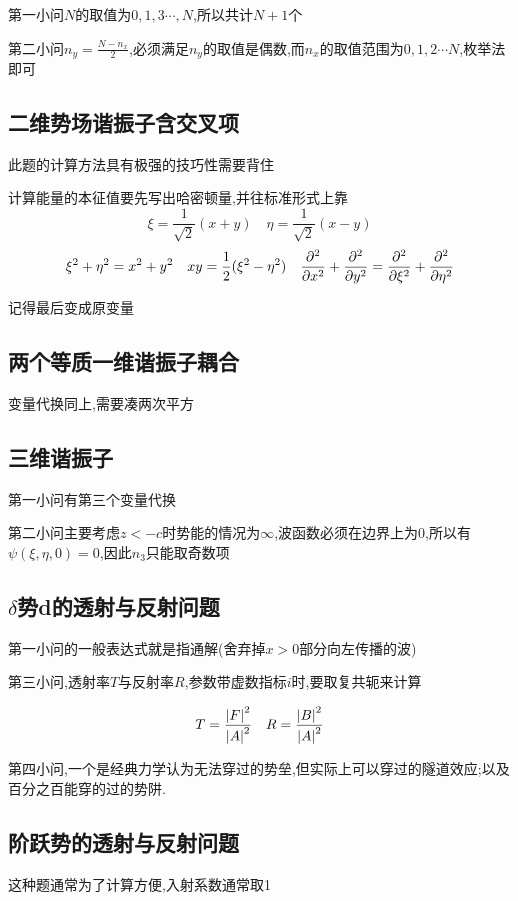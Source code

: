 \documentclass{article}
\begin{document}
            第一小问$N$的取值为$0,1,3\cdots,N$,所以共计$N+1$个
            
            第二小问$ n_{y} = \frac{ N - n_{x}}{2} $,必须满足$n_{y}$的取值是偶数,而$n_{x}$的取值范围为$0,1,2\cdots N$,枚举法即可

        \subsection{二维势场谐振子含交叉项}
            此题的计算方法具有极强的技巧性需要背住
            
            计算能量的本征值要先写出哈密顿量,并往标准形式上靠
            $$ \xi = \frac{1}{\sqrt{2}} (x+y) \quad \eta = \frac{1}{\sqrt{2}} (x -y)  $$
            $$ \xi^{2} + \eta^{2} = x^{2} + y^{2} \quad xy = \frac{1}{2} (\xi^{2} - \eta^{2}) \quad \pdv[2]{x} + \pdv[2]{y} = \pdv[2]{\xi} + \pdv[2]{\eta}$$
            
            记得最后变成原变量

        \subsection{两个等质一维谐振子耦合}
            变量代换同上,需要凑两次平方

        \subsection{三维谐振子}
            第一小问有第三个变量代换

            第二小问主要考虑$z<-c$时势能的情况为$\infty$,波函数必须在边界上为0,所以有$ \psi(\xi,\eta,0) = 0 $,因此$n_{3}$只能取奇数项
        
        \subsection{\texorpdfstring{$\delta$}{}势d的透射与反射问题}
            第一小问的一般表达式就是指通解(舍弃掉$x>0$部分向左传播的波)

            第三小问,透射率$T$与反射率$R$,参数带虚数指标$i$时,要取复共轭来计算  

            $$ T = \frac{\abs{F}^{2}}{\abs{A}^{2}} \quad R = \frac{\abs{B}^{2}}{\abs{A}^{2}} $$

            第四小问,一个是经典力学认为无法穿过的势垒,但实际上可以穿过的隧道效应;以及百分之百能穿的过的势阱.

        \subsection{阶跃势的透射与反射问题}
            这种题通常为了计算方便,入射系数通常取1
\end{document}
